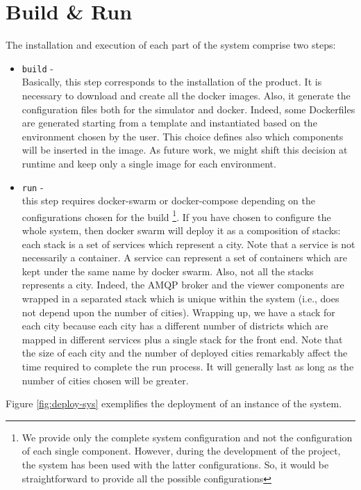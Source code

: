 \section{Build \& Run}
The installation and execution of each part of the system comprise two steps:

\begin{itemize}
   \item \texttt{build} -
   \\
   Basically, this step corresponds to the installation of the product.
   It is necessary to download and create all the docker
   images. Also, it generate the configuration files both for the simulator and
   docker. Indeed, some Dockerfiles are generated starting from a template and
   instantiated based on the environment chosen by the user. This choice defines
   also which components will be inserted in the image. As future work,
   we might shift this decision at runtime and keep only a single image for each
   environment.
   \item \texttt{run} -
   \\
   this step requires docker-swarm
	or docker-compose depending on the configurations chosen for the build
	\footnote{We provide only the complete system configuration and not the
	configuration of each single component.
   However, during the development of the project,
	the system has been used with the latter configurations.
	So, it would be straightforward to provide all the possible configurations}.
	If you have chosen to configure the whole system, then docker swarm
   will deploy it as a composition of stacks:
   each stack is a set of services which represent
   a city. Note that a service is not necessarily a container.
   A service can represent a set of containers which are kept under the same
   name by docker swarm.
   Also, not all the stacks represents a city. Indeed, the AMQP broker
   and the viewer components are wrapped in a separated
   stack which is unique within the system (i.e., does not depend upon the
   number of cities). Wrapping up, we have a stack for each city because
   each city has a different number of districts which are mapped in different
   services plus a single stack for the front end.
   Note that the size of each city and the number of deployed
   cities remarkably affect the time required to complete the run process.
	It will generally last as long as the number of cities chosen will be greater.
\end{itemize}

Figure \ref{fig:deploy-sys} exemplifies the deployment of an instance of the
system.


